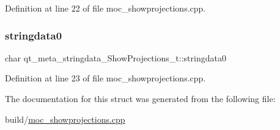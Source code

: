 Definition at line 22 of file moc\+\_\+showprojections.\+cpp.

\mbox{\label{structqt__meta__stringdata___show_projections__t_a68cb16ddbcfc62fc21eac5777911529a}} 
\subsubsection{\texorpdfstring{stringdata0}{stringdata0}}
{\footnotesize\ttfamily char qt\+\_\+meta\+\_\+stringdata\+\_\+\+Show\+Projections\+\_\+t\+::stringdata0}



Definition at line 23 of file moc\+\_\+showprojections.\+cpp.



The documentation for this struct was generated from the following file\+:\begin{DoxyCompactItemize}
\item 
build/\mbox{\hyperlink{build_2moc__showprojections_8cpp}{moc\+\_\+showprojections.\+cpp}}\end{DoxyCompactItemize}
